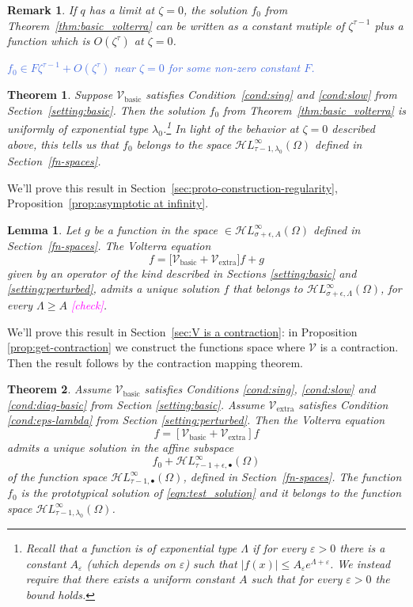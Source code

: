 \documentclass{article}
\theoremstyle{plain}
\newtheorem{lemma}{Lemma}
\newtheorem{thm}{Theorem}
\newtheorem{rmk}{Remark}
\newcommand{\singexp}[2]{\mathcal{H}L^\infty_{#1, #2}}
\newcommand{\singexpalg}[1]{\singexp{#1}{\bullet}}
\newcommand{\volterra}{\mathcal{V}}
\newcommand{\hardpart}{\mathcal{V}_\text{basic}}
\newcommand{\softpart}{\mathcal{V}_\text{extra}}
\newcommand{\domain}{\Omega}
\begin{document}
\begin{rmk}
If $q$ has a limit at $\zeta = 0$, the solution $f_0$ from Theorem~\ref{thm:basic_volterra} can be written as a constant mutiple of $\zeta^{\tau-1}$ plus a function which is $O(\zeta^\tau)$ at $\zeta = 0$.

\textcolor{RoyalBlue}{$f_0 \in F\zeta^{\tau-1} + O(\zeta^\tau)$ near $\zeta = 0$ for some non-zero constant $F$.}
\end{rmk}
\begin{thm}\label{thm:proto-growth}
Suppose $\hardpart$ satisfies {\em Condition~\eqref{cond:sing}} and {\em \eqref{cond:slow}} from Section~\ref{setting:basic}. Then the solution $f_0$ from {\em Theorem~\ref{thm:basic_volterra}} is uniformly of exponential type $\lambda_0$.\footnote{Recall that a function is of exponential type $\Lambda$ if for every $\varepsilon>0$ there is a constant $A_\varepsilon$ (which depends on $\varepsilon$) such that $|f(x)|\leq A_\varepsilon e^{\Lambda+\varepsilon} $. We instead require that there exists a uniform constant $A$ such that for every $\varepsilon>0$ the bound holds.} In light of the behavior at $\zeta = 0$ described above, this tells us that $f_0$ belongs to the space $\singexp{\tau-1}{\lambda_0}(\domain)$ defined in Section~\ref{fn-spaces}.
\end{thm}

We'll prove this result in Section~\ref{sec:proto-construction-regularity}, Proposition~\ref{prop:asymptotic at infinity}.

\begin{lemma}\label{thm:perturbed_volterra}
Let $g$ be a function in the space $\in\singexp{\sigma+\epsilon}{A}(\Omega)$ defined in Section~\ref{fn-spaces}. The Volterra equation
\[ f = \Big[\hardpart +\softpart \Big] f + g \]
given by an operator of the kind described in Sections \ref{setting:basic} and \ref{setting:perturbed}, admits a unique solution $f$ that belongs to $\singexp{\sigma+\epsilon}{\Lambda}(\Omega)$, for every $\Lambda\geq A$ \textcolor{magenta}{[check]}. 
\end{lemma}

We'll prove this result in Section~\ref{sec:V is a contraction}: in Proposition \ref{prop:get-contraction} we construct the functions space where $\volterra$ is a contraction. Then the result follows by the contraction mapping theorem.  


\begin{thm}\label{thm:general_volterra}
    Assume $\hardpart$ satisfies {\em Conditions \eqref{cond:sing}, \eqref{cond:slow}} and {\em \eqref{cond:diag-basic}} from Section \ref{setting:basic}. Assume $\softpart$ satisfies {\em Condition \eqref{cond:eps-lambda}} from Section \ref{setting:perturbed}. Then the Volterra equation 
    \[f = \left[ \hardpart + \softpart \right] f\]
    admits a unique solution in the affine subspace
\[ f_0 + \singexpalg{\tau-1+\epsilon}(\Omega) \]
of the function space $\singexpalg{\tau-1}(\Omega)$, defined in Section~\ref{fn-spaces}. The function $f_0$ is the prototypical solution of \eqref{eqn:test_solution} and it belongs to the function space $\singexp{\tau-1}{\lambda_0}(\Omega)$.
\end{thm}
\end{document}
